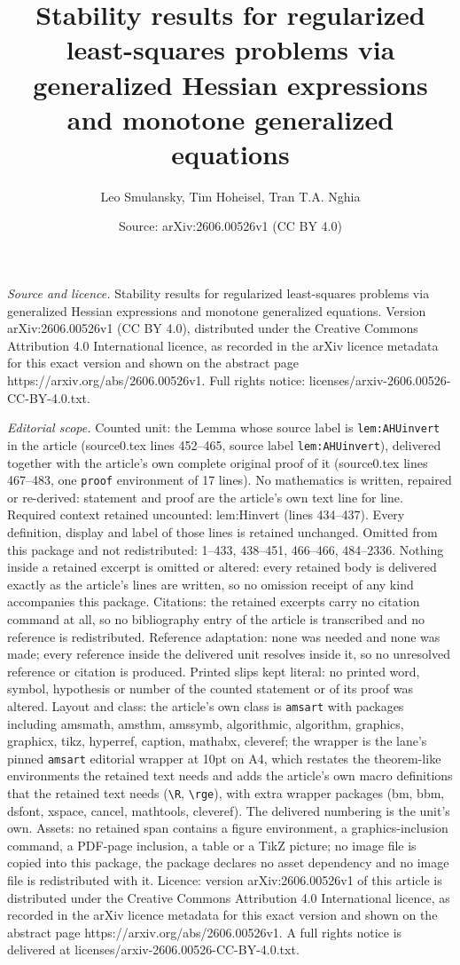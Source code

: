\documentclass[10pt,a4paper]{amsart}
\title[Stability results for regularized least-squares problems via]{Stability results for regularized least-squares problems via generalized Hessian expressions and monotone generalized equations}
\author{Leo Smulansky, Tim Hoheisel, Tran T.A. Nghia}
\date{Source: arXiv:2606.00526v1 (CC BY 4.0)}
\begin{document}
\maketitle

\noindent\emph{Source and licence.} Stability results for regularized least-squares problems via generalized Hessian expressions and monotone generalized equations. Version arXiv:2606.00526v1 (CC BY 4.0), distributed under the Creative Commons Attribution 4.0 International licence, as recorded in the arXiv licence metadata for this exact version and shown on the abstract page https://arxiv.org/abs/2606.00526v1. Full rights notice: licenses/arxiv-2606.00526-CC-BY-4.0.txt.\par\smallskip

\noindent\textit{Editorial scope.} Counted unit: the Lemma whose source label is \texttt{lem:AHUinvert} in the article (source0.tex lines 452--465, source label \texttt{lem:AHUinvert}), delivered together with the article's own complete original proof of it (source0.tex lines 467--483, one \texttt{proof} environment of 17 lines). No mathematics is written, repaired or re-derived: statement and proof are the article's own text line for line. Required context retained uncounted: lem:Hinvert (lines 434--437). Every definition, display and label of those lines is retained unchanged. Omitted from this package and not redistributed: 1--433, 438--451, 466--466, 484--2336. Nothing inside a retained excerpt is omitted or altered: every retained body is delivered exactly as the article's lines are written, so no omission receipt of any kind accompanies this package. Citations: the retained excerpts carry no citation command at all, so no bibliography entry of the article is transcribed and no reference is redistributed. Reference adaptation: none was needed and none was made; every reference inside the delivered unit resolves inside it, so no unresolved reference or citation is produced. Printed slips kept literal: no printed word, symbol, hypothesis or number of the counted statement or of its proof was altered. Layout and class: the article's own class is \texttt{amsart} with packages including amsmath, amsthm, amssymb, algorithmic, algorithm, graphics, graphicx, tikz, hyperref, caption, mathabx, cleveref; the wrapper is the lane's pinned \texttt{amsart} editorial wrapper at 10pt on A4, which restates the theorem-like environments the retained text needs and adds the article's own macro definitions that the retained text needs (\texttt{\textbackslash R}, \texttt{\textbackslash rge}), with extra wrapper packages (bm, bbm, dsfont, xspace, cancel, mathtools, cleveref). The delivered numbering is the unit's own. Assets: no retained span contains a figure environment, a graphics-inclusion command, a PDF-page inclusion, a table or a TikZ picture; no image file is copied into this package, the package declares no asset dependency and no image file is redistributed with it. Licence: version arXiv:2606.00526v1 of this article is distributed under the Creative Commons Attribution 4.0 International licence, as recorded in the arXiv licence metadata for this exact version and shown on the abstract page https://arxiv.org/abs/2606.00526v1. A full rights notice is delivered at licenses/arxiv-2606.00526-CC-BY-4.0.txt. 
\end{document}
